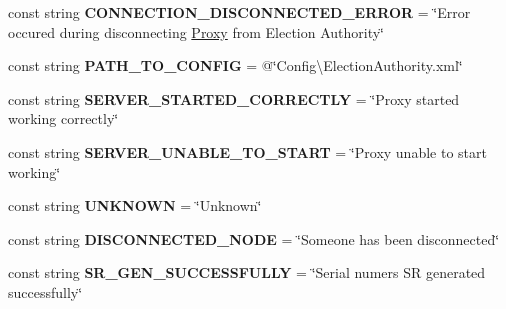 \begin{DoxyCompactItemize}
\item 
\hypertarget{class_proxy_1_1_constants_a80501c63e677bc7617de37a6e12c83be}{}const string {\bfseries C\+O\+N\+N\+E\+C\+T\+I\+O\+N\+\_\+\+D\+I\+S\+C\+O\+N\+N\+E\+C\+T\+E\+D\+\_\+\+E\+R\+R\+O\+R} = \char`\"{}Error occured during disconnecting \hyperlink{class_proxy_1_1_proxy}{Proxy} from Election Authority\char`\"{}\label{class_proxy_1_1_constants_a80501c63e677bc7617de37a6e12c83be}

\item 
\hypertarget{class_proxy_1_1_constants_a2c0c5b6ac04d2abb71d3b65ea4218fcb}{}const string {\bfseries P\+A\+T\+H\+\_\+\+T\+O\+\_\+\+C\+O\+N\+F\+I\+G} = @\char`\"{}Config\textbackslash{}\+Election\+Authority.\+xml\char`\"{}\label{class_proxy_1_1_constants_a2c0c5b6ac04d2abb71d3b65ea4218fcb}

\item 
\hypertarget{class_proxy_1_1_constants_ab9e56a171d60668b38581e698c9a5111}{}const string {\bfseries S\+E\+R\+V\+E\+R\+\_\+\+S\+T\+A\+R\+T\+E\+D\+\_\+\+C\+O\+R\+R\+E\+C\+T\+L\+Y} = \char`\"{}Proxy started working correctly\char`\"{}\label{class_proxy_1_1_constants_ab9e56a171d60668b38581e698c9a5111}

\item 
\hypertarget{class_proxy_1_1_constants_a12d41896fc3cd52619726b84ce7f426c}{}const string {\bfseries S\+E\+R\+V\+E\+R\+\_\+\+U\+N\+A\+B\+L\+E\+\_\+\+T\+O\+\_\+\+S\+T\+A\+R\+T} = \char`\"{}Proxy unable to start working\char`\"{}\label{class_proxy_1_1_constants_a12d41896fc3cd52619726b84ce7f426c}

\item 
\hypertarget{class_proxy_1_1_constants_adab04c35d90e92cef6c9920b6fe8d972}{}const string {\bfseries U\+N\+K\+N\+O\+W\+N} = \char`\"{}Unknown\char`\"{}\label{class_proxy_1_1_constants_adab04c35d90e92cef6c9920b6fe8d972}

\item 
\hypertarget{class_proxy_1_1_constants_a36d61e8222ab2eef8f76fcdf8f28809f}{}const string {\bfseries D\+I\+S\+C\+O\+N\+N\+E\+C\+T\+E\+D\+\_\+\+N\+O\+D\+E} = \char`\"{}Someone has been disconnected\char`\"{}\label{class_proxy_1_1_constants_a36d61e8222ab2eef8f76fcdf8f28809f}

\item 
\hypertarget{class_proxy_1_1_constants_ae6a14db328009921bb2c25985546780b}{}const string {\bfseries S\+R\+\_\+\+G\+E\+N\+\_\+\+S\+U\+C\+C\+E\+S\+S\+F\+U\+L\+L\+Y} = \char`\"{}Serial numers S\+R generated successfully\char`\"{}\label{class_proxy_1_1_constants_ae6a14db328009921bb2c25985546780b}


\end{DoxyCompactItemize}
